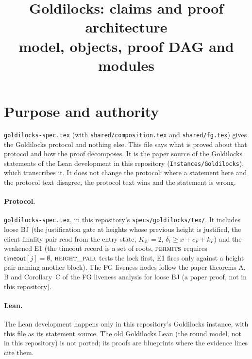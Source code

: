 \documentclass{article}
\title{Goldilocks: claims and proof architecture\\[2pt]
\large model, objects, proof DAG and modules}
\author{}
\date{}
\newcommand{\fname}[1]{\text{\textsc{#1}}}
\newcommand{\cF}{c_F}
\begin{document}
\maketitle

\section{Purpose and authority}\label{sec:purpose}

\texttt{goldilocks-spec.tex} (with \texttt{shared/composition.tex} and
\texttt{shared/fg.tex}) gives the Goldilocks protocol and nothing else.  This
file says what is proved about that protocol and how the proof decomposes.  It
is the paper source of the Goldilocks statements of the Lean development in
this repository (\texttt{Instances/Goldilocks}), which transcribes it.  It does not change the
protocol: where a statement here and the protocol text disagree, the protocol
text wins and the statement is wrong.

\paragraph{Protocol.}  \texttt{goldilocks-spec.tex}, in this repository's
\texttt{specs/goldilocks/tex/}.  It includes
loose BJ (the justification gate at heights whose previous height is justified, the client
finality pair read from the entry state, $K_W=2$,
$\delta_{\mathrm t}\geq x+\cF+k_F$) and the weakened E1 (the
timeout record is a set of roots, $\fname{permits}$ requires
$\mathsf{timeout}[j]=\emptyset$, $\fname{height\_pair}$ tests the lock
first, E1 fires only against a height pair naming another block).  The
FG liveness nodes follow the paper theorems A, B and Corollary~C of the FG
liveness analysis for loose BJ (a paper proof, not in this repository).

\paragraph{Lean.}  The Lean development happens only in this repository's
Goldilocks instance, with this file as its statement source.  The old Goldilocks
Lean (the round model, not in this repository) is not
ported; its proofs are blueprints where the evidence lines cite them.
\end{document}
